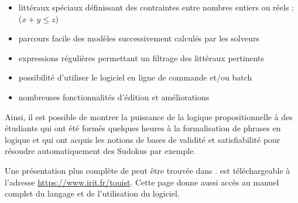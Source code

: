 \begin{itemize}
\item littéraux spéciaux définissant des contraintes entre nombres entiers ou réels : ($x+y\leq z$)

\item parcours facile des modèles successivement calculés par les solveurs

\item expressions régulières permettant un filtrage des littéraux pertinents

\item possibilité d'utiliser le logiciel en ligne de commande et/ou batch

\item nombreuses fonctionnalités d'édition et améliorations
\end{itemize}
Ainsi, il est possible de montrer la puissance de la logique propositionnelle à des étudiants qui ont été formés quelques heures à la formalisation de phrases en logique et qui ont acquis les notions de bases de validité et satisfiabilité pour résoudre automatiquement des Sudokus par exemple. 

Une présentation plus complète de \touist peut être trouvée dans \cite{DBLP:journals/corr/SlimaneCGHLMV15}. \touist est téléchargeable à l'adresse \url{https://www.irit.fr/touist}. Cette page donne aussi accès au manuel complet du langage et de l'utilisation du logiciel.







